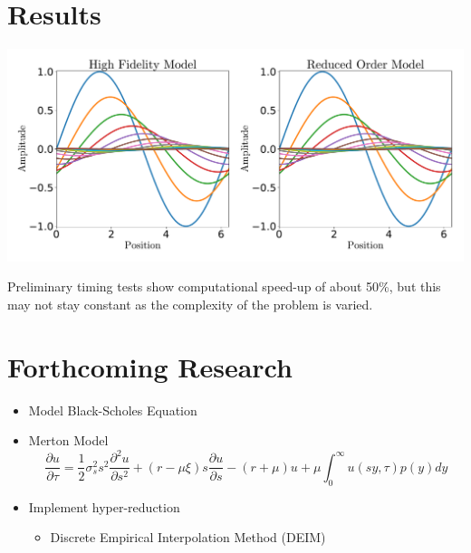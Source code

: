 \documentclass{a0poster}
\begin{document}
\begin{multicols}{3}
\section{Results}

\includegraphics[width=\linewidth]{fig.pdf}

Preliminary timing tests show computational speed-up of about 50\%, but this may not stay constant as the complexity of the problem is varied.

\vspace{-1.5cm}
\section{Forthcoming Research}
\vspace{-1cm}
\begin{itemize}
	\item Model Black-Scholes Equation
	\item Merton Model
	$$\frac{\partial u}{\partial \tau} = \frac{1}{2} \sigma^2_s s^2 \frac{\partial^2 u}{\partial s^2} + (r-\mu \xi) s \frac{\partial u}{\partial s} - (r+\mu)u + \mu \int_{0}^{\infty}u (sy,\tau)p(y)dy$$
	\item Implement hyper-reduction
	\begin{itemize}
		\item Discrete Empirical Interpolation Method (DEIM)
	\end{itemize}
\end{itemize}
\large
\nocite{*} %


\end{multicols}
\end{document}
